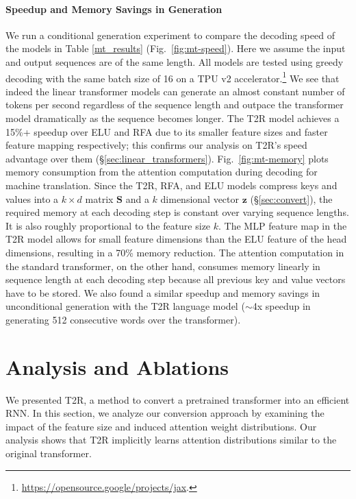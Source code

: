 \documentclass[11pt]{article}
\def\vz{{\mathbf{z}}}
\def\mS{{\mathbf{S}}}
\newcommand{\TRNN}{T2R\xspace}
\begin{document}
\paragraph{Speedup and Memory Savings in Generation}
We run a conditional generation experiment to compare the decoding speed of the models in Table \ref{mt_results} (Fig.\ \ref{fig:mt-speed}).
Here we assume the input and output sequences are of the same length.
All models are tested using greedy decoding with the same batch size of 16 on a TPU v2 accelerator.\footnote{\url{https://opensource.google/projects/jax}.}
We see that indeed the linear transformer models can generate an almost constant number of tokens per second regardless of the sequence length and outpace the transformer model dramatically as the sequence becomes longer.
The \TRNN model achieves a 15\%+ speedup over ELU and RFA due to its smaller feature sizes and faster feature mapping respectively; this confirms our analysis on \TRNN's speed advantage over them (\S\ref{sec:linear_transformers}).
Fig.\ \ref{fig:mt-memory} plots memory consumption from the attention computation during decoding for machine translation. Since the \TRNN, RFA, and ELU models compress keys and values into a $k \times d$ matrix $\mS$ and a $k$ dimensional vector $\vz$ (\S\ref{sec:convert}), the required memory at each decoding step is constant over varying sequence lengths.
It is also roughly proportional to the feature size $k$. The MLP feature map in the \TRNN model allows for small feature dimensions than the ELU feature of the head dimensions, resulting in a 70\% memory reduction.
The attention computation in the standard transformer, on the other hand, consumes memory linearly in sequence length at each decoding step because all previous key and value vectors have to be stored.
We also found a similar speedup and memory savings in unconditional generation with the \TRNN language model ($\sim$4x speedup in generating 512 consecutive words over the transformer).


\section{Analysis and Ablations}
We presented \TRNN, a method to convert a pretrained transformer into an efficient RNN.
In this section, we analyze our conversion approach by examining the impact of the feature size and induced attention weight distributions.
Our analysis shows that \TRNN implicitly learns attention distributions similar to the original transformer.
\end{document}
